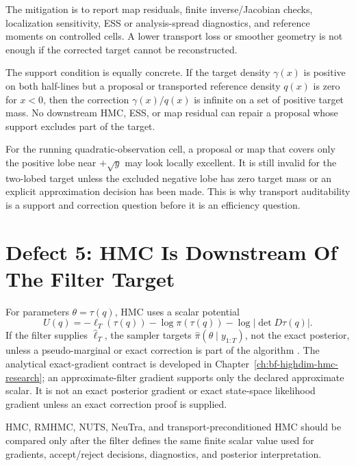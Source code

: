 The mitigation is to report map residuals, finite inverse/Jacobian checks,
localization sensitivity, ESS or analysis-spread diagnostics, and reference
moments on controlled cells.  A lower transport loss or smoother geometry is
not enough if the corrected target cannot be reconstructed.

The support condition is equally concrete.  If the target density
\(\gamma(x)\) is positive on both half-lines but a proposal or transported
reference density \(q(x)\) is zero for \(x<0\), then the correction
\(\gamma(x)/q(x)\) is infinite on a set of positive target mass.  No downstream
HMC, ESS, or map residual can repair a proposal whose support excludes part of
the target.

For the running quadratic-observation cell, a proposal or map that covers only
the positive lobe near \(+\sqrt y\) may look locally excellent.  It is still
invalid for the two-lobed target unless the excluded negative lobe has zero
target mass or an explicit approximation decision has been made.  This is why
transport auditability is a support and correction question before it is an
efficiency question.

\section{Defect 5: HMC Is Downstream Of The Filter Target}
\label{sec:bf-hd-defect-hmc}

For parameters \(\theta=\tau(q)\), HMC uses a scalar potential
\begin{equation}
  U(q)=-\ell_T(\tau(q))-\log\pi(\tau(q))
       -\log|\det D\tau(q)|.
  \label{eq:bf-hd-synth-hmc-target}
\end{equation}
If the filter supplies \(\widehat\ell_T\), the sampler targets
\(\widehat\pi(\theta\mid y_{1:T})\), not the exact posterior, unless a
pseudo-marginal or exact correction is part of the algorithm
\citep{andrieu2009pseudo,andrieu2010particle}.
The analytical exact-gradient contract is developed in
Chapter~\ref{ch:bf-highdim-hmc-research}; an approximate-filter gradient
supports only the declared approximate scalar.  It is not an exact posterior
gradient or exact state-space likelihood gradient unless an exact correction
proof is supplied.

\begin{proposition}
\label{prop:bf-hd-hmc-downstream}
HMC, RMHMC, NUTS, NeuTra, and transport-preconditioned HMC should be compared
only after the filter defines the same finite scalar value used for gradients,
accept/reject decisions, diagnostics, and posterior interpretation.
\end{proposition}

